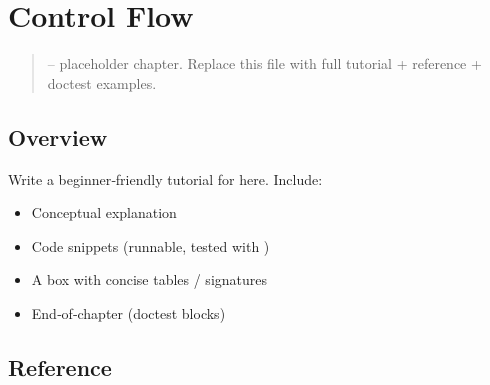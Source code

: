 \documentclass[a4paper,11pt,english]{sphinxmanual}
\begin{document}
\sphinxstepscope


\section{Control Flow}
\label{\detokenize{core_language/control_flow:control-flow}}\label{\detokenize{core_language/control_flow::doc}}\begin{quote}

\sphinxAtStartPar
{} – placeholder chapter. Replace this file with full tutorial + reference + doctest examples.
\end{quote}


\subsection{Overview}
\label{\detokenize{core_language/control_flow:overview}}
\sphinxAtStartPar
Write a beginner‑friendly tutorial for  here. Include:
\begin{itemize}
\item {} 
\sphinxAtStartPar
Conceptual explanation

\item {} 
\sphinxAtStartPar
Code snippets (runnable, tested with )

\item {} 
\sphinxAtStartPar
A  box with concise tables / signatures

\item {} 
\sphinxAtStartPar
End‑of‑chapter  (doctest blocks)

\end{itemize}


\subsection{Reference}
\label{\detokenize{core_language/control_flow:reference}}
\end{document}
